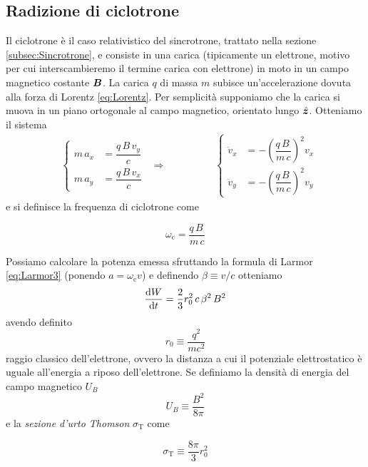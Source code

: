 \subsection{Radizione di ciclotrone}\label{subsec:Ciclotrone}
Il ciclotrone è il caso relativistico del sincrotrone, trattato nella sezione \ref{subsec:Sincrotrone}, e consiste in una carica (tipicamente un elettrone, motivo per cui interscambieremo il termine carica con elettrone) in moto in un campo magnetico costante $\V{B}$. La carica $q$ di massa $m$ subisce un'accelerazione dovuta alla forza di Lorentz \ref{eq:Lorentz}. Per semplicità supponiamo che la carica si muova in un piano ortogonale al campo magnetico, orientato lungo $\vers{z}$. Otteniamo il sistema
\begin{align}
&\begin{cases}
m\,a_x &=  \dfrac{q \, B\, v_y}{c} \\[10pt]
m\,a_y &=  \dfrac{q \, B\, v_x}{c}
\end{cases}
&\Longrightarrow \,\,\,\,\,\,\,\,\,\,\,\,\,\,\,\,\,\,\,\,\,\,\,\,\,\,
&\begin{cases}
\ddot{v}_x &= -\left(\dfrac{q\, B\,}{m\, c}\right)^2 v_x \\[10pt]
\ddot{v}_y &= -\left(\dfrac{q\, B\,}{m\, c}\right)^2 v_y
\end{cases}
\end{align}
e si definisce la frequenza di ciclotrone come 
\begin{EQ}
\begin{equation}
\omega_\mathrm{c} = \dfrac{q\, B\,}{m\, c}
\end{equation}
\end{EQ}
Possiamo calcolare la potenza emessa sfruttando la formula di Larmor \ref{eq:Larmor3} (ponendo $a= \omega_\mathrm{c} v$) e definendo $\beta \equiv v/c $ otteniamo
\begin{equation}
\dfrac{\mathrm{d} {W}}{\mathrm{d} {t}} = \dfrac{2}{3} r_0^2 \, c\,\beta^2\, B^2
\end{equation}
avendo definito 
\begin{equation}
r_0 \equiv \dfrac{q^2}{m c^2}
\end{equation}
raggio classico dell'elettrone, ovvero la distanza a cui il potenziale elettrostatico è uguale all'energia a riposo dell'elettrone. Se definiamo la densità di energia del campo magnetico $U_B$
\begin{equation}
U_B \equiv \dfrac{B^2}{8\pi}
\end{equation}
e la \textit{sezione d'urto Thomson} $\sigma_\mathrm{T}$ come 
\begin{EQ}
\begin{equation}
\sigma_\mathrm{T} \equiv \dfrac{8\pi}{3} r_0^2
\end{equation}
\end{EQ}
